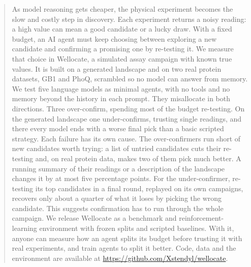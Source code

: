 \begin{abstract}
As model reasoning gets cheaper, the physical experiment becomes the slow and costly step in discovery. Each experiment returns a noisy reading: a high value can mean a good candidate or a lucky draw. With a fixed budget, an AI agent must keep choosing between exploring a new candidate and confirming a promising one by re-testing it. We measure that choice in Wellocate, a simulated assay campaign with known true values. It is built on a generated landscape and on two real protein datasets, GB1 and PhoQ, scrambled so no model can answer from memory. We test five language models as minimal agents, with no tools and no memory beyond the history in each prompt. They misallocate in both directions. Three over-confirm, spending most of the budget re-testing. On the generated landscape one under-confirms, trusting single readings, and there every model ends with a worse final pick than a basic scripted strategy. Each failure has its own cause. The over-confirmers run short of new candidates worth trying: a list of untried candidates cuts their re-testing and, on real protein data, makes two of them pick much better. A running summary of their readings or a description of the landscape changes it by at most five percentage points. For the under-confirmer, re-testing its top candidates in a final round, replayed on its own campaigns, recovers only about a quarter of what it loses by picking the wrong candidate. This suggests confirmation has to run through the whole campaign. We release Wellocate as a benchmark and reinforcement-learning environment with frozen splits and scripted baselines. With it, anyone can measure how an agent splits its budget before trusting it with real experiments, and train agents to split it better. Code, data and the environment are available at
\url{https://github.com/Xstendyl/wellocate}.
\end{abstract}
